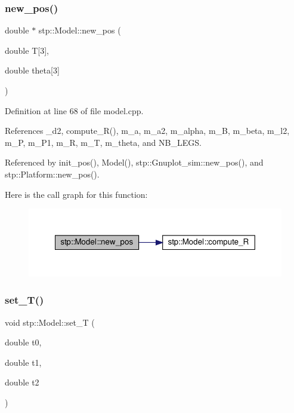 \subsubsection{\texorpdfstring{new\+\_\+pos()}{new\_pos()}}
{\footnotesize\ttfamily double $\ast$ stp\+::\+Model\+::new\+\_\+pos (\begin{DoxyParamCaption}\item[{double}]{T\mbox{[}3\mbox{]},  }\item[{double}]{theta\mbox{[}3\mbox{]} }\end{DoxyParamCaption})}



Definition at line 68 of file model.\+cpp.



References \+\_\+d2, compute\+\_\+\+R(), m\+\_\+a, m\+\_\+a2, m\+\_\+alpha, m\+\_\+B, m\+\_\+beta, m\+\_\+l2, m\+\_\+P, m\+\_\+\+P1, m\+\_\+R, m\+\_\+T, m\+\_\+theta, and N\+B\+\_\+\+L\+E\+GS.



Referenced by init\+\_\+pos(), Model(), stp\+::\+Gnuplot\+\_\+sim\+::new\+\_\+pos(), and stp\+::\+Platform\+::new\+\_\+pos().

Here is the call graph for this function\+:\nopagebreak
\begin{figure}[H]
\begin{center}
\leavevmode
\includegraphics[width=350pt]{classstp_1_1_model_a553d9f7f63c97eba26e3522a73531dc1_cgraph}
\end{center}
\end{figure}
\mbox{\label{classstp_1_1_model_ade58705e09f3edf93f43a51021517f9e}} 
\subsubsection{\texorpdfstring{set\+\_\+\+T()}{set\_T()}}
{\footnotesize\ttfamily void stp\+::\+Model\+::set\+\_\+T (\begin{DoxyParamCaption}\item[{double}]{t0,  }\item[{double}]{t1,  }\item[{double}]{t2 }\end{DoxyParamCaption})\hspace{0.3cm}{\ttfamily [protected]}}



